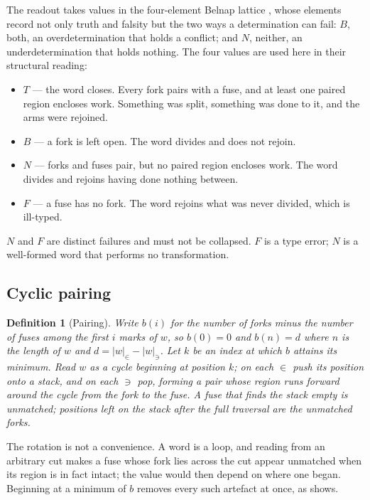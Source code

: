 \documentclass[12pt,a4paper]{article}
\newtheorem{definition}[theorem]{Definition}
\begin{document}
The readout takes values in the four-element Belnap lattice \cite{belnap1977,
dunn1976}, whose elements record not only truth and falsity but the two ways a
determination can fail: $B$, both, an overdetermination that holds a conflict; and
$N$, neither, an underdetermination that holds nothing. The four values are used
here in their structural reading:

\begin{itemize}
\item $T$ --- the word closes. Every fork pairs with a fuse, and at least one
      paired region encloses work. Something was split, something was done to it,
      and the arms were rejoined.
\item $B$ --- a fork is left open. The word divides and does not rejoin.
\item $N$ --- forks and fuses pair, but no paired region encloses work. The word
      divides and rejoins having done nothing between.
\item $F$ --- a fuse has no fork. The word rejoins what was never divided, which is
      ill-typed.
\end{itemize}

$N$ and $F$ are distinct failures and must not be collapsed. $F$ is a type error;
$N$ is a well-formed word that performs no transformation.

\subsection{Cyclic pairing}\label{sec:cyclic}

\begin{definition}[Pairing]
\label{def:pairing}
Write $b(i)$ for the number of forks minus the number of fuses among the first $i$
marks of $w$, so $b(0) = 0$ and $b(n) = d$ where $n$ is the length of $w$ and
$d = |w|_{\in} - |w|_{\ni}$. Let $k$ be an index at which $b$ attains its minimum.
Read $w$ as a cycle beginning at position $k$; on each $\in$ push its position onto
a stack, and on each $\ni$ pop, forming a pair whose \emph{region} runs forward
around the cycle from the fork to the fuse. A fuse that finds the stack empty is
\emph{unmatched}; positions left on the stack after the full traversal are the
\emph{unmatched forks}.
\end{definition}

The rotation is not a convenience. A word is a loop, and reading from an arbitrary
cut makes a fuse whose fork lies across the cut appear unmatched when its region is
in fact intact; the value would then depend on where one began. Beginning at a
minimum of $b$ removes every such artefact at once, as  shows.
\end{document}
